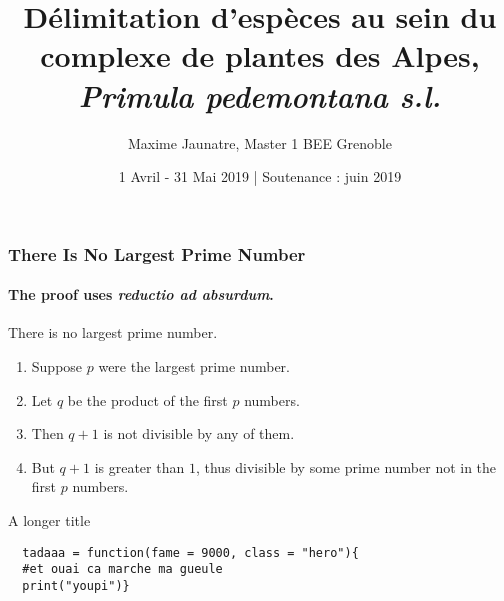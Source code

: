 \documentclass{beamer}
\title{\textbf{Délimitation d'espèces au sein du complexe de plantes des Alpes,} \textit{Primula pedemontana s.l.}}
\author{Maxime Jaunatre, Master 1 BEE Grenoble}
\date{1 Avril - 31 Mai 2019  |  Soutenance : juin 2019 }
\makeatletter
\def\insertlabo{\def\inst{\beamer@insttitle}\def\and{\beamer@andtitle}#2}%
\makeatother
\begin{document}
\begin{frame}
\maketitle





\end{frame}


\begin{frame} 
\frametitle{There Is No Largest Prime Number} 
\framesubtitle{The proof uses \textit{reductio ad absurdum}.} 
\begin{theorem}
There is no largest prime number. \end{theorem} 
\begin{enumerate} 
\item<1-| alert@1> Suppose $p$ were the largest prime number. 
\item<2-> Let $q$ be the product of the first $p$ numbers. 
\item<3-> Then $q+1$ is not divisible by any of them. 
\item<1-> But $q + 1$ is greater than $1$, thus divisible by some prime
number not in the first $p$ numbers.
\end{enumerate}
\end{frame}

\begin{frame}{A longer title}

\end{frame}

\begin{frame}[fragile]
\begin{lstlisting}
  tadaaa = function(fame = 9000, class = "hero"){
  #et ouai ca marche ma gueule
  print("youpi")}
\end{lstlisting}
\end{frame}
  

\cite{}


\end{document}
